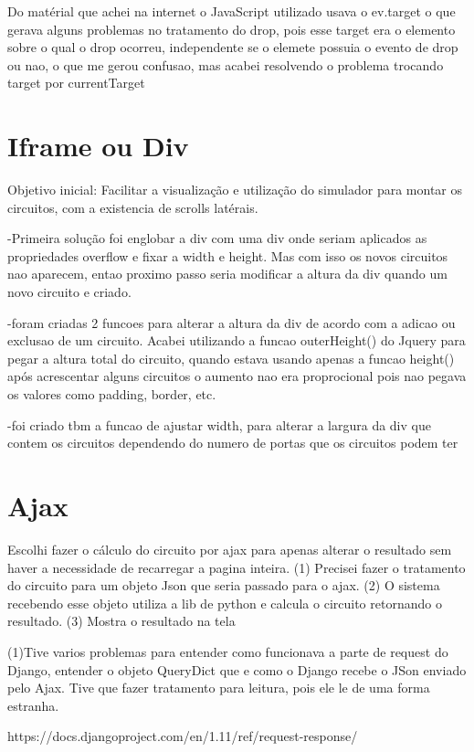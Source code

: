 \documentclass[a4paper, 12pt, oneside]{book}
\begin{document}
Do matérial que achei na internet o JavaScript utilizado usava o ev.target o que gerava alguns problemas no tratamento do drop, pois esse target era o elemento sobre o qual o drop ocorreu, independente se o elemete possuia o evento de drop ou nao, o que me gerou confusao, mas acabei resolvendo o problema trocando target por currentTarget

\section{Iframe ou Div}

Objetivo inicial: Facilitar a visualização e utilização do simulador para montar os circuitos, com a existencia de scrolls latérais.

-Primeira solução foi englobar a div com uma div onde seriam aplicados as propriedades overflow e fixar a width e height. Mas com isso os novos circuitos nao aparecem, entao proximo passo seria modificar a altura da div quando um novo circuito e criado.

-foram criadas 2 funcoes para alterar a altura da div de acordo com a adicao ou exclusao de um circuito. Acabei utilizando a funcao outerHeight() do Jquery para pegar a altura total do circuito, quando estava usando apenas a funcao height() após acrescentar alguns circuitos o aumento nao era proprocional pois nao pegava os valores como padding, border, etc.

-foi criado tbm a funcao de ajustar width, para alterar a largura da div que contem os circuitos dependendo do numero de portas que os circuitos podem ter


\section{Ajax}

Escolhi fazer o cálculo do circuito por ajax para apenas alterar o resultado sem haver a necessidade de recarregar a pagina inteira. (1) Precisei fazer o tratamento do circuito para um objeto Json que seria passado para o ajax. (2) O sistema recebendo esse objeto utiliza a lib de python e calcula o circuito retornando o resultado. (3) Mostra o resultado na tela

(1)Tive varios problemas para entender como funcionava a parte de request do Django, entender o objeto QueryDict que e como o Django recebe o JSon enviado pelo Ajax. Tive que fazer tratamento para leitura, pois ele le de uma forma estranha.

https://docs.djangoproject.com/en/1.11/ref/request-response/
\end{document}
